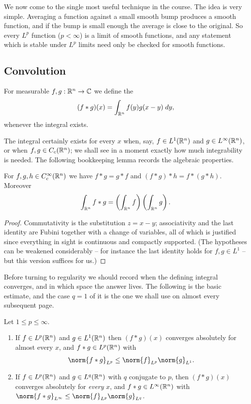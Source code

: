 \documentclass[a4paper]{scrartcl}
\begin{document}
We now come to the single most useful technique in the course. The idea is very simple. Averaging a function against a small smooth bump produces a smooth function, and if the bump is small enough the average is close to the original. So every $L^p$ function ($p< \infty$) is a limit of smooth functions, and any statement which is stable under $L^p$ limits need only be checked for smooth functions.

\subsection{Convolution}

\begin{definition}[Convolution]
	For measurable $f, g : \mathbb{R}^n \to \mathbb{C}$ we define the 
	$$(f*g)(x) = \int_{\mathbb{R}^n} f(y) g(x-y) \; d y,$$
	whenever the integral exists.
\end{definition}

The integral certainly exists for every $x$ when, say, $f \in L^1(\mathbb{R}^n)$ and $g \in L^\infty(\mathbb{R}^n)$, or when $f, g \in C_c(\mathbb{R}^n)$; we shall see in a moment exactly how much integrability is needed. The following bookkeeping lemma records the algebraic properties.

\begin{lemma}\label{lem:convalg}
	For $f, g, h \in C_c^\infty(\mathbb{R}^n)$ we have $f * g = g*f$ and $(f*g)*h = f*(g*h)$. Moreover
	$$\int_{\mathbb{R}^n} f * g = \left(\int_{\mathbb{R}^n} f\right)\left(\int_{\mathbb{R}^n} g \right).$$
\end{lemma}

\begin{proof}
	Commutativity is the substitution $z = x - y$; associativity and the last identity are Fubini together with a change of variables, all of which is justified since everything in sight is continuous and compactly supported. (The hypotheses can be weakened considerably -- for instance the last identity holds for $f, g \in L^1$ -- but this version suffices for us.)
\end{proof}

Before turning to regularity we should record when the defining integral converges, and in which space the answer lives. The following is the basic estimate, and the case $q = 1$ of it is the one we shall use on almost every subsequent page.

\begin{theorem}\label{thm:youngconv}
	Let $1 \le p \le \infty$.
	\begin{enumerate}[label=(\roman*)]
		\item If $f \in L^p(\mathbb{R}^n)$ and $g \in L^1(\mathbb{R}^n)$ then $(f*g)(x)$ converges absolutely for almost every $x$, and $f * g \in L^p(\mathbb{R}^n)$ with
		$$\norm{f*g}_{L^p}\le\norm{f}_{L^p}\norm{g}_{L^1}.$$
		\item If $f \in L^p(\mathbb{R}^n)$ and $g \in L^q(\mathbb{R}^n)$ with $q$ conjugate to $p$, then $(f*g)(x)$ converges absolutely for \emph{every} $x$, and $f * g \in L^\infty(\mathbb{R}^n)$ with $\norm{f*g}_{L^\infty}\le\norm{f}_{L^p}\norm{g}_{L^q}$.
	\end{enumerate}
\end{theorem}
\end{document}
